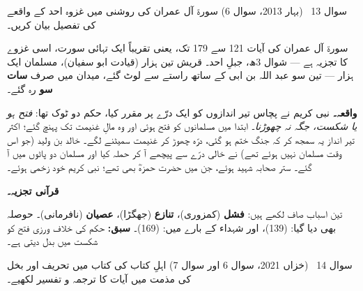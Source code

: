 \begin{sawal}{سوال \textenglish{13} \ \textnormal{\small(بہار \textenglish{2013}، سوال \textenglish{6})}}
سورۃ آل عمران کی روشنی میں غزوہ احد کے واقعے کی تفصیل بیان کریں۔
\end{sawal}

\begin{hal}
سورۃ آل عمران کی آیات \textenglish{121} سے \textenglish{179} تک، یعنی
تقریباً ایک تہائی سورت، اسی غزوے کا تجزیہ ہے --- شوال \textenglish{3}ھ، جبلِ
احد۔ قریش تین ہزار (قیادت ابو سفیان)، مسلمان ایک ہزار --- تین سو عبد اللہ بن
ابی کے ساتھ راستے سے لوٹ گئے، میدان میں صرف \textbf{سات سو} رہ گئے۔

\medskip
\textbf{واقعہ۔} نبی کریم \saw نے پچاس تیر اندازوں کو ایک درّے پر مقرر کیا،
حکم دو ٹوک تھا: \emph{فتح ہو یا شکست، جگہ نہ چھوڑنا}۔ ابتدا میں مسلمانوں کو
فتح ہوئی اور وہ مالِ غنیمت تک پہنچ گئے؛ اکثر تیر انداز یہ سمجھ کر کہ جنگ ختم
ہو گئی، درّہ چھوڑ کر غنیمت سمیٹنے لگے۔ خالد بن ولید (جو اس وقت مسلمان نہیں
ہوئے تھے) نے خالی درّے سے پیچھے آ کر حملہ کیا اور مسلمان دو پاٹوں میں آ گئے۔
ستر صحابہ شہید ہوئے، جن میں حضرت حمزہؓ بھی تھے؛ نبی کریم \saw خود زخمی ہوئے۔

\medskip
\textbf{قرآنی تجزیہ۔}

\smallskip
تین اسباب صاف لکھے ہیں: \textbf{فشل} (کمزوری)، \textbf{تنازع} (جھگڑا)،
\textbf{عصیان} (نافرمانی)۔ حوصلہ بھی دیا گیا: 
(\textenglish{139})، اور شہداء کے بارے میں:  (\textenglish{169})۔ \textbf{سبق:} حکم کی خلاف ورزی
فتح کو شکست میں بدل دیتی ہے۔
\end{hal}

\begin{sawal}{سوال \textenglish{14} \ \textnormal{\small(خزاں \textenglish{2021}، سوال \textenglish{6} اور سوال \textenglish{7})}}
اہلِ کتاب کی کتاب میں تحریف اور بخل کی مذمت میں آیات کا ترجمہ و تفسیر لکھیے۔
\end{sawal}


